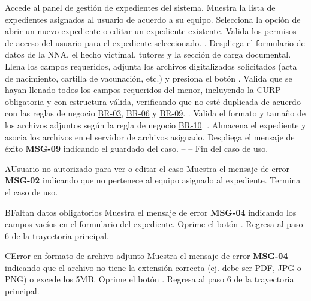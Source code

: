  \begin{UCtrayectoria}
 	\UCpaso[\UCactor] Accede al panel de gestión de expedientes del sistema.
 	\UCpaso Muestra la lista de expedientes asignados al usuario de acuerdo a su equipo.
 	\UCpaso[\UCactor] Selecciona la opción de abrir un nuevo expediente o editar un expediente existente.
 	\UCpaso Valida los permisos de acceso del usuario para el expediente seleccionado. .
 	\UCpaso Despliega el formulario de datos de la NNA, el hecho victimal, tutores y la sección de carga documental.
 	\UCpaso[\UCactor] Llena los campos requeridos, adjunta los archivos digitalizados solicitados (acta de nacimiento, cartilla de vacunación, etc.) y presiona el botón .
 	\UCpaso Valida que se hayan llenado todos los campos requeridos del menor, incluyendo la CURP obligatoria y con estructura válida, verificando que no esté duplicada de acuerdo con las reglas de negocio \hyperlink{BR-03}{BR-03}, \hyperlink{BR-06}{BR-06} y \hyperlink{BR-09}{BR-09}. .
 	\UCpaso Valida el formato y tamaño de los archivos adjuntos según la regla de negocio \hyperlink{BR-10}{BR-10}. .
 	\UCpaso Almacena el expediente y asocia los archivos en el servidor de archivos asignado.
 	\UCpaso Despliega el mensaje de éxito {\bf MSG-09} indicando el guardado del caso.
 	\UCpaso[] -- -- Fin del caso de uso.
 \end{UCtrayectoria}

\begin{UCtrayectoriaA}{A}{Usuario no autorizado para ver o editar el caso}
	\UCpaso Muestra el mensaje de error {\bf MSG-02} indicando que no pertenece al equipo asignado al expediente.
	\UCpaso Termina el caso de uso.
\end{UCtrayectoriaA}

\begin{UCtrayectoriaA}{B}{Faltan datos obligatorios}
	\UCpaso Muestra el mensaje de error {\bf MSG-04} indicando los campos vacíos en el formulario del expediente.
	\UCpaso[\UCactor] Oprime el botón .
	\UCpaso Regresa al paso 6 de la trayectoria principal.
\end{UCtrayectoriaA}

\begin{UCtrayectoriaA}{C}{Error en formato de archivo adjunto}
	\UCpaso Muestra el mensaje de error {\bf MSG-04} indicando que el archivo no tiene la extensión correcta (ej. debe ser PDF, JPG o PNG) o excede los 5MB.
	\UCpaso[\UCactor] Oprime el botón .
	\UCpaso Regresa al paso 6 de la trayectoria principal.
\end{UCtrayectoriaA}
